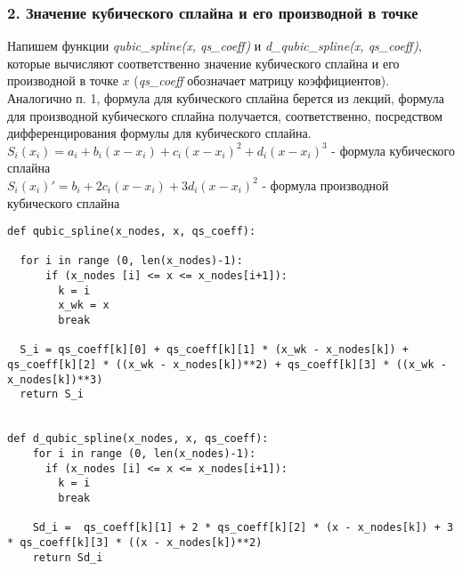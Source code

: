\subsubsection{2. Значение кубического сплайна
и его производной в точке}
Напишем функции \textit{qubic_spline(x, qs_coeff)} и \textit{d_qubic_spline(x, qs_coeff)}, которые вычисляют соответственно значение кубического сплайна и его производной в точке $x$ (\textit{qs_coeff} обозначает матрицу коэффициентов).
Аналогично п. 1, формула для кубического сплайна
берется из лекций, формула для производной кубического сплайна получается, соответственно,
посредством дифференцирования формулы для кубического сплайна. \\
$S_i(x_i)  = a_i + b_i(x - x_i) + c_i(x - x_i)^2 + d_i(x - x_i)^3$ - формула кубического сплайна\\
$S_i(x_i)'  = b_i+ 2c_i(x - x_i) + 3d_i(x - x_i)^2$ - формула производной кубического сплайна
\begin{lstlisting}   
def qubic_spline(x_nodes, x, qs_coeff):
  
  for i in range (0, len(x_nodes)-1):
      if (x_nodes [i] <= x <= x_nodes[i+1]):
        k = i
        x_wk = x
        break

  S_i = qs_coeff[k][0] + qs_coeff[k][1] * (x_wk - x_nodes[k]) + qs_coeff[k][2] * ((x_wk - x_nodes[k])**2) + qs_coeff[k][3] * ((x_wk - x_nodes[k])**3)
  return S_i


def d_qubic_spline(x_nodes, x, qs_coeff):
    for i in range (0, len(x_nodes)-1):
      if (x_nodes [i] <= x <= x_nodes[i+1]):
        k = i
        break
        
    Sd_i =  qs_coeff[k][1] + 2 * qs_coeff[k][2] * (x - x_nodes[k]) + 3 * qs_coeff[k][3] * ((x - x_nodes[k])**2)
    return Sd_i
\end{lstlisting} 
